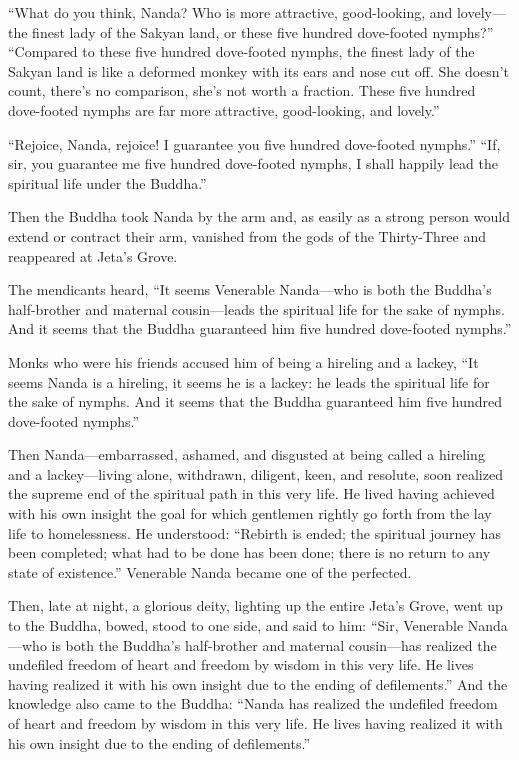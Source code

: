 \documentclass[12pt,openany]{book}%
\begin{document}
“What do you think, Nanda? Who is more attractive, good-looking, and lovely—the finest lady of the Sakyan land, or these five hundred dove-footed nymphs?” “Compared to these five hundred dove-footed nymphs, the finest lady of the Sakyan land is like a deformed monkey with its ears and nose cut off. She doesn’t count, there’s no comparison, she’s not worth a fraction. These five hundred dove-footed nymphs are far more attractive, good-looking, and lovely.” 

“Rejoice, Nanda, rejoice! I guarantee you five hundred dove-footed nymphs.” “If, sir, you guarantee me five hundred dove-footed nymphs, I shall happily lead the spiritual life under the Buddha.” 

Then the Buddha took Nanda by the arm and, as easily as a strong person would extend or contract their arm, vanished from the gods of the Thirty-Three and reappeared at Jeta’s Grove. 

The mendicants heard, “It seems Venerable Nanda—who is both the Buddha’s half-brother and maternal cousin—leads the spiritual life for the sake of nymphs. And it seems that the Buddha guaranteed him five hundred dove-footed nymphs.” 

Monks who were his friends accused him of being a hireling and a lackey, “It seems Nanda is a hireling, it seems he is a lackey: he leads the spiritual life for the sake of nymphs. And it seems that the Buddha guaranteed him five hundred dove-footed nymphs.” 

Then Nanda—embarrassed, ashamed, and disgusted at being called a hireling and a lackey—living alone, withdrawn, diligent, keen, and resolute, soon realized the supreme end of the spiritual path in this very life. He lived having achieved with his own insight the goal for which gentlemen rightly go forth from the lay life to homelessness. He understood: “Rebirth is ended; the spiritual journey has been completed; what had to be done has been done; there is no return to any state of existence.” Venerable Nanda became one of the perfected. 

Then, late at night, a glorious deity, lighting up the entire Jeta’s Grove, went up to the Buddha, bowed, stood to one side, and said to him: “Sir, Venerable Nanda—who is both the Buddha’s half-brother and maternal cousin—has realized the undefiled freedom of heart and freedom by wisdom in this very life. He lives having realized it with his own insight due to the ending of defilements.” And the knowledge also came to the Buddha: “Nanda has realized the undefiled freedom of heart and freedom by wisdom in this very life. He lives having realized it with his own insight due to the ending of defilements.” 
\end{document}
